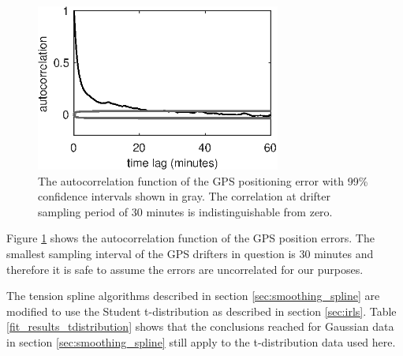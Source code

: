 \documentclass[10pt,journal]{IEEEtran}
\begin{document}
\begin{figure}
  \centerline{\includegraphics[width=19pc,angle=0]{figures/gps_autocorrelation}}
  \caption{The autocorrelation function of the GPS positioning error with 99\% confidence intervals shown in gray. The correlation at drifter sampling period of 30 minutes is indistinguishable from zero.}
  \label{gps_autocorrelation}
\end{figure}

Figure \ref{gps_autocorrelation} shows the autocorrelation function of the GPS position errors. The smallest sampling interval of the GPS drifters in question is 30 minutes and therefore it is safe to assume the errors are uncorrelated for our purposes.

The tension spline algorithms described in section \ref{sec:smoothing_spline} are modified to use the Student t-distribution as described in section \ref{sec:irls}. Table \ref{fit_results_tdistribution} shows that the conclusions reached for Gaussian data in section \ref{sec:smoothing_spline} still apply to the t-distribution data used here.
\end{document}
